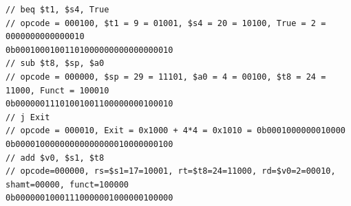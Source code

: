 \documentclass{exam}
\begin{document}
\begin{questions}
\begin{verbatim}
// beq $t1, $s4, True 
// opcode = 000100, $t1 = 9 = 01001, $s4 = 20 = 10100, True = 2 = 0000000000000010
0b00010001001101000000000000000010 
// sub $t8, $sp, $a0  
// opcode = 000000, $sp = 29 = 11101, $a0 = 4 = 00100, $t8 = 24 = 11000, Funct = 100010
0b00000011101001001100000000100010
// j Exit
// opcode = 000010, Exit = 0x1000 + 4*4 = 0x1010 = 0b0001000000010000
0b00001000000000000000010000000100
// add $v0, $s1, $t8
// opcode=000000, rs=$s1=17=10001, rt=$t8=24=11000, rd=$v0=2=00010, shamt=00000, funct=100000
0b00000010001110000001000000100000
\end{verbatim}

\end{questions}
\end{document}
